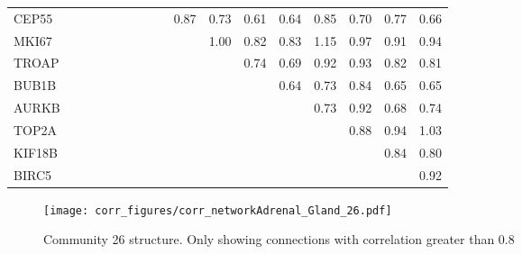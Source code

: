 \begin{longtable}{lrrrrrrrrrrrrrrrr}
CEP55  &            &            &              &             &              &            &            &             &        0.87 &        0.73 &        0.61 &        0.64 &        0.85 &         0.70 &        0.77 &        0.66 \\
MKI67  &            &            &              &             &              &            &            &             &             &        1.00 &        0.82 &        0.83 &        1.15 &         0.97 &        0.91 &        0.94 \\
TROAP  &            &            &              &             &              &            &            &             &             &             &        0.74 &        0.69 &        0.92 &         0.93 &        0.82 &        0.81 \\
BUB1B  &            &            &              &             &              &            &            &             &             &             &             &        0.64 &        0.73 &         0.84 &        0.65 &        0.65 \\
AURKB  &            &            &              &             &              &            &            &             &             &             &             &             &        0.73 &         0.92 &        0.68 &        0.74 \\
TOP2A  &            &            &              &             &              &            &            &             &             &             &             &             &             &         0.88 &        0.94 &        1.03 \\
KIF18B &            &            &              &             &              &            &            &             &             &             &             &             &             &              &        0.84 &        0.80 \\
BIRC5  &            &            &              &             &              &            &            &             &             &             &             &             &             &              &             &        0.92 \\
\end{longtable}


\begin{figure}[h!]
\centering
\texttt{[image: corr\_figures/corr\_networkAdrenal\_Gland\_26.pdf]}
\caption{Community 26 structure. Only showing connections with correlation greater than 0.8}
\end{figure}



